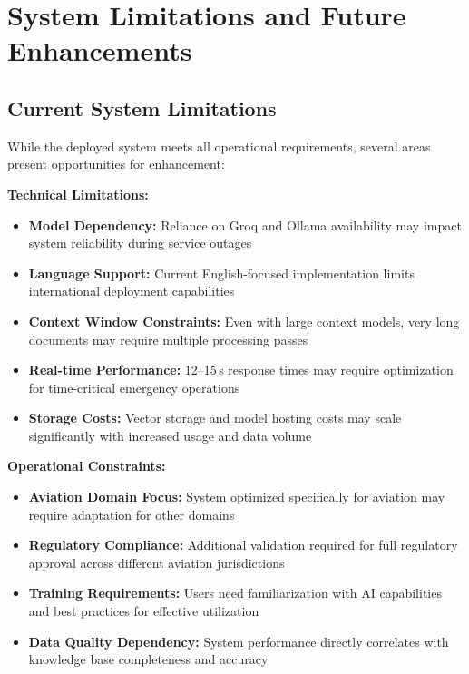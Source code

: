 \section{System Limitations and Future Enhancements}
\label{sec:limitations_future_s3}

\subsection{Current System Limitations}
\label{subsec:current_limitations_s3}

While the deployed system meets all operational requirements, several areas present opportunities for enhancement:

\textbf{Technical Limitations:}
\begin{itemize}
    \item \textbf{Model Dependency:} Reliance on Groq and Ollama availability may impact system reliability during service outages
    \item \textbf{Language Support:} Current English-focused implementation limits international deployment capabilities
    \item \textbf{Context Window Constraints:} Even with large context models, very long documents may require multiple processing passes
    \item \textbf{Real-time Performance:} 12--15\,s response times may require optimization for time-critical emergency operations
    \item \textbf{Storage Costs:} Vector storage and model hosting costs may scale significantly with increased usage and data volume
\end{itemize}

\textbf{Operational Constraints:}
\begin{itemize}
    \item \textbf{Aviation Domain Focus:} System optimized specifically for aviation may require adaptation for other domains
    \item \textbf{Regulatory Compliance:} Additional validation required for full regulatory approval across different aviation jurisdictions
    \item \textbf{Training Requirements:} Users need familiarization with AI capabilities and best practices for effective utilization
    \item \textbf{Data Quality Dependency:} System performance directly correlates with knowledge base completeness and accuracy
\end{itemize}

